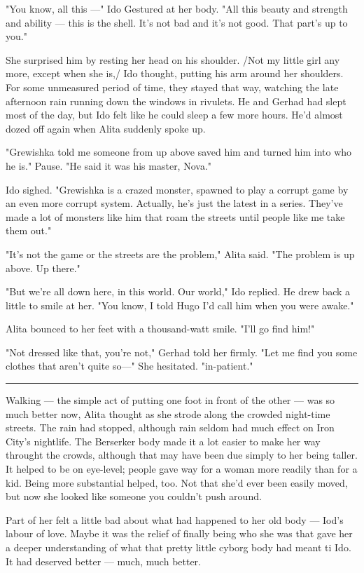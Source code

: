 \documentclass[11pt]{article}
\begin{document}
"You know, all this ---" Ido Gestured at her body. "All this beauty and strength and ability --- this is the shell. It's not bad and it's not good. That part's up to you."

She surprised him by resting her head on his shoulder. /Not my little girl any more, except when she is,/ Ido thought, putting his arm around her shoulders. For some unmeasured period of time, they stayed that way, watching the late afternoon rain running down the windows in rivulets. He and Gerhad had slept most of the day, but Ido felt like he could sleep a few more hours. He'd almost dozed off again when Alita suddenly spoke up.

"Grewishka told me someone from up above saved him and turned him into who he is." Pause. "He said it was his master, Nova."

Ido sighed. "Grewishka is a crazed monster, spawned to play a corrupt game by an even more corrupt system. Actually, he's just the latest in a series. They've made a lot of monsters like him that roam the streets until people like me take them out."

"It's not the game or the streets are the problem," Alita said. "The problem is up above. Up there."

"But we're all down here, in this world. Our world," Ido replied. He drew back a little to smile at her. "You know, I told Hugo I'd call him when you were awake."

Alita bounced to her feet with a thousand-watt smile. "I'll go find him!"

"Not dressed like that, you're not," Gerhad told her firmly. "Let me find you some clothes that aren't quite so---" She hesitated. "in-patient."




\rule{\linewidth}{0.5pt}




Walking --- the simple act of putting one foot in front of the other --- was so much better now, Alita thought as she strode along the crowded night-time streets. The rain had stopped, although rain seldom had much effect on Iron City's nightlife. The Berserker body made it a lot easier to make her way throught the crowds, although that may have been due simply to her being taller. It helped to be on eye-level; people gave way for a woman more readily than for a kid. Being more substantial helped, too. Not that she'd ever been easily moved, but now she looked like someone you couldn't push around.

Part of her felt a little bad about what had happened to her old body --- Iod's labour of love. Maybe it was the relief of finally being who she was that gave her a deeper understanding of what that pretty little cyborg body had meant ti Ido. It had deserved better --- much, much better.
\end{document}

